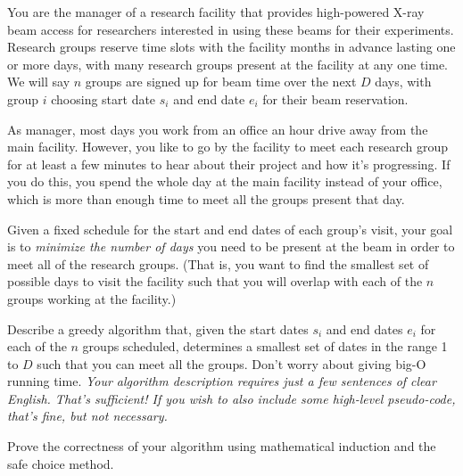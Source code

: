 \documentclass{ks-pset}
\begin{document}
\begin{problem}
  You are the manager of a research facility that provides high-powered X-ray
  beam access for researchers interested in using these beams for their
  experiments.  Research groups reserve time slots with the facility months in
  advance lasting one or more days, with many research groups present at the
  facility at any one time.  We will say $n$ groups are signed up for beam time
  over the next $D$ days, with group $i$ choosing start date $s_i$ and end date
  $e_i$ for their beam reservation.

  As manager, most days you work from an office an hour drive away from the
  main facility.  However, you like to go by the facility to meet each research
  group for at least a few minutes to hear about their project and how it's
  progressing.  If you do this, you spend the whole day at the main facility
  instead of your office, which is more than enough time to meet all the groups
  present that day.

  Given a fixed schedule for the start and end dates of each group's visit,
  your goal is to \emph{minimize the number of days} you need to be present at
  the beam in order to meet all of the research groups.  (That is, you want to
  find the smallest set of possible days to visit the facility such that you
  will overlap with each of the $n$ groups working at the facility.)

  \begin{subproblems}
    \item Describe a greedy algorithm that, given the start dates $s_i$ and end
      dates $e_i$ for each of the $n$ groups scheduled, determines a smallest
      set of dates in the range 1 to $D$ such that you can meet all the groups.
      Don't worry about giving big-O running time.  \emph{Your algorithm
        description requires just  a few sentences of clear English.  That's
        sufficient!  If you wish to also include some high-level pseudo-code,
      that's fine, but not necessary.}
    \item Prove the correctness of your algorithm using mathematical induction
      and the safe choice method.
  \end{subproblems}
\end{problem}

\begin{solution}
\end{solution}
\end{document}
